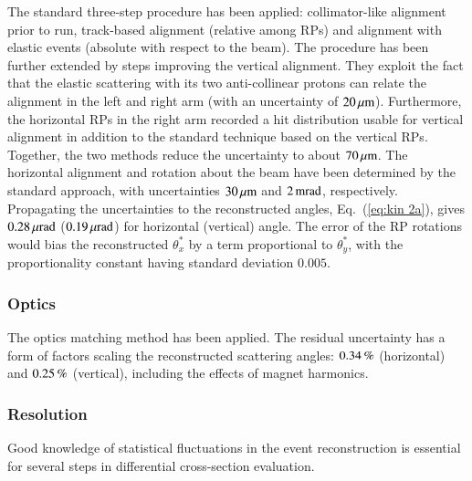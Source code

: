 The standard three-step procedure \cite{totem-ijmp} has been applied: collimator-like alignment prior to run, track-based alignment (relative among RPs) and alignment with elastic events (absolute with respect to the beam). The procedure has been further extended by steps improving the vertical alignment. They exploit the fact that the elastic scattering with its two anti-collinear protons can relate the alignment in the left and right arm (with an uncertainty of $20\,{\rm \mu m}$). Furthermore, the horizontal RPs in the right arm recorded a hit distribution usable for vertical alignment in addition to the standard technique based on the vertical RPs. Together, the two methods reduce the uncertainty to about $70\,{\rm \mu m}$. The horizontal alignment and rotation about the beam have been determined by the standard approach, with uncertainties $30\,{\rm \mu m}$ and $2\,{\rm m rad}$, respectively. Propagating the uncertainties to the reconstructed angles, Eq.~(\ref{eq:kin 2a}), gives $0.28\,{\rm \mu rad}$ ($0.19\,{\rm \mu rad}$) for horizontal (vertical) angle. The error of the RP rotations would bias the reconstructed $\theta_x^*$ by a term proportional to $\theta_y^*$, with the proportionality constant having standard deviation $0.005$.



\subsubsection{Optics}
\label{sec:optics}

The optics matching method \cite{totem-optics} has been applied. The residual uncertainty has a form of factors scaling the reconstructed scattering angles:
$0.34\,{\rm \%}$ (horizontal) and $0.25\,{\rm \%}$ (vertical), including the effects of magnet harmonics.



\subsubsection{Resolution}
\label{sec:resolution}

Good knowledge of statistical fluctuations in the event reconstruction is essential for several steps in differential cross-section evaluation.

